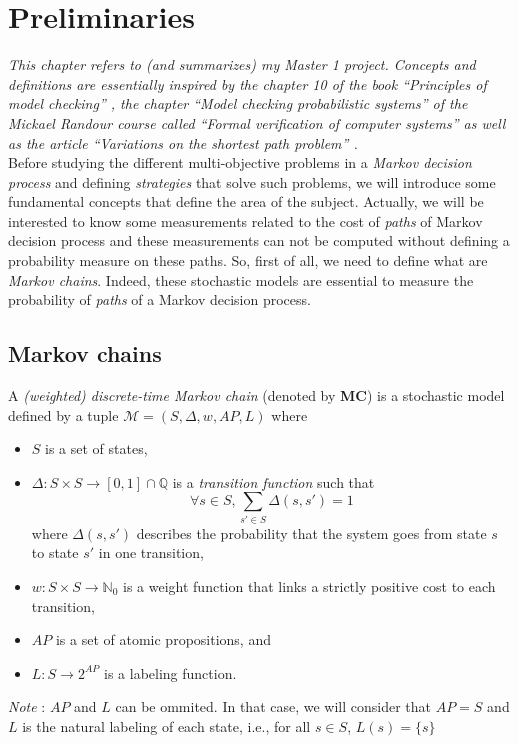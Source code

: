 \chapter{Preliminaries}
\textit{This chapter refers to (and summarizes) my Master 1 project. Concepts and definitions are essentially inspired by the chapter 10 of the book ``Principles of model checking'' \cite{PMC}, the chapter ``Model checking probabilistic systems'' of the Mickael Randour course called ``Formal verification of computer systems'' \cite{MRV} as well as the article ``Variations on the shortest path problem'' \cite{DBLP:journals/corr/RandourRS14a}.} \\

Before studying the different multi-objective problems in a \textit{Markov decision
process} and defining \textit{strategies} that solve such problems, we will introduce some fundamental concepts that define the area of the subject.
Actually, we will be interested to know some measurements related to the cost of \textit{paths} of Markov decision process and these measurements can not be computed without defining a probability measure on these paths.
So, first of all, we need to define what are \textit{Markov chains}. Indeed, these
stochastic models are essential to measure the probability of \textit{paths} of a Markov decision process.

\section{Markov chains}
\begin{definition}
  A \textit{(weighted) discrete-time Markov chain} (denoted by \textbf{MC}) is a stochastic model defined by a tuple $\mathcal{M}=(S, \Delta, w, AP, L)$ where
	\begin{itemize}
		\item $S$ is a set of states,
		\item $\Delta: S \times S \rightarrow [0,1] \cap \mathbb{Q}$ is a  \textit{transition function} such that \[\forall s \in S, \sum_{s' \in S}\Delta(s, s')= 1\]
		where $\Delta(s, s')$ describes the probability that the system goes from state $s$ to state $s'$ in one transition,
    \item $w : S \times S \rightarrow \mathbb{N}_0$ %
      is a weight function that links a strictly positive cost to each transition,
    \item $AP$ is a set of atomic propositions, and
    \item $L : S \rightarrow 2^{AP}$ is a labeling function.
	\end{itemize}
  \textit{Note }: $AP$ and $L$ can be ommited. In that case, we will consider that $AP = S$ and $L$ is the natural labeling of each state, i.e., for all $s \in S$, $L(s) = \{s\}$
\end{definition}

